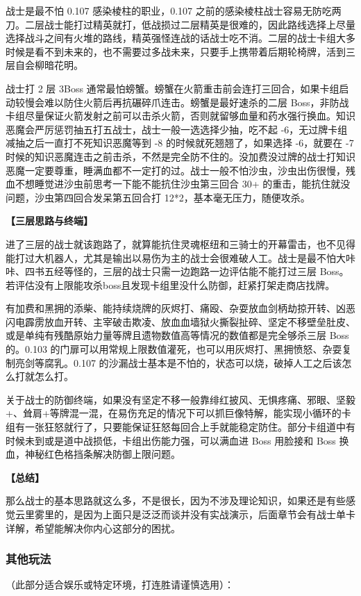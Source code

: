 \documentclass[12pt, a4paper]{article}
\begin{document}
战士是最不怕 0.107 感染棱柱的职业，0.107 之前的感染棱柱战士容易无防吃两刀。二层战士能打过精英就打，低战损过二层精英是很难的，因此路线选择上尽量选择战斗之间有火堆的路线，精英强怪连战的话战士吃不消。二层的战士卡组大多时候是看不到未来的，也不需要过多战未来，只要手上携带着后期轮椅牌，活到三层自会柳暗花明。

战士打 2 层 3Boss 通常最怕螃蟹。螃蟹在火箭重击前会连打三回合，如果卡组启动较慢会难以防住火箭后再抗碾碎爪连击。螃蟹是最好速杀的二层 Boss，非防战卡组尽量保证火箭发射之前可以击杀火箭，否则就留够血量和药水强行换血。知识恶魔会严厉惩罚抽五打五战士，战士一般一选选择少抽，吃不起 -6，无过牌卡组减抽之后一直打不死知识恶魔等到 -8 的时候就死翘翘了，如果选择 -6，就要在 -7 时候的知识恶魔连击之前击杀，不然是完全防不住的。没加费没过牌的战士打知识恶魔一定要尊重，睡满血都不一定打的过。战士一般不怕沙虫，沙虫出伤很慢，残血不想睡觉进沙虫前思考一下能不能抗住沙虫第三回合 30+ 的重击，能抗住就没问题，沙虫第四回合发呆第五回合打 12*2，基本毫无压力，随便攻杀。

\textbf{【三层思路与终端】}

进了三层的战士就该跑路了，就算能抗住灵魂枢纽和三骑士的开幕雷击，也不见得能打过大机器人，尤其是输出以易伤为主的战士会很难破人工。战士是最不怕大咔咔、四书五经等怪的，三层的战士只需一边跑路一边评估能不能打过三层 Boss。若评估没有上限能攻杀boss且发现卡组里没什么防御，赶紧打架走商店找牌。

有加费和黑拥的添柴、能持续烧牌的灰烬打、痛殴、杂耍放血剑柄劫掠开转、凶恶闪电霹雳放血开转、主宰破击欺凌、放血血墙狱火撕裂扯碎、坚定不移壁垒肚皮、或是单纯有残酷原始力量等牌且遗物数值高等情况的数值都是完全够杀三层 Boss 的。0.103 的门扉可以用常规上限数值灌死，也可以用灰烬打、黑拥愤怒、杂耍复制亮剑等腐乳。0.107 的沙漏战士基本是不怕的，状态可以烧，破掉人工之后该怎么打就怎么打。

关于战士的防御终端，如果没有坚定不移一般靠绯红披风、无惧疼痛、邪眼、坚毅+、耸肩+等牌混一混，在易伤充足的情况下可以抓巨像特解，能实现小循环的卡组有一张狂怒就行了，只要能保证狂怒每回合上手就能稳定防住。部分卡组道中有时候未到或是道中战损低，卡组出伤能力强，可以满血进 Boss 用脸接和 Boss 换血，神秘红色格挡条解决防御上限问题。

\textbf{【总结】}

那么战士的基本思路就这么多，不是很长，因为不涉及理论知识，如果还是有些感觉云里雾里的，是因为上面只是泛泛而谈并没有实战演示，后面章节会有战士单卡详解，希望能解决你内心这部分的困扰。

\subsubsection{其他玩法}
（此部分适合娱乐或特定环境，打连胜请谨慎选用）：
\end{document}
